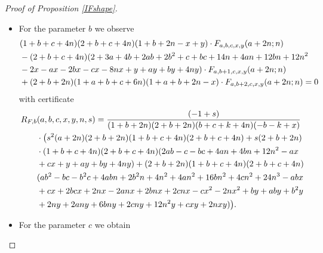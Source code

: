 \documentclass{amsart}
\numberwithin{equation}{section}
\begin{document}
\begin{proof}[Proof of Proposition \ref{IFshape}]
\begin{itemize}
\begin{align}
                 4 c n - 12 n^2 + a x + c x + 4 n x  \hphantom{a}\notag\\
            &+y + a y + b y + 4 n y)\cdot F_{a+1,b,c,x,y}(a+1+2n;n)\hphantom{a}\notag\\
            &+(1 + a + b + c + 6 n) (1 + a + b + 2 n - x)\cdot F_{a+2,b,c,x,y}(a+2+2n;n)=0\notag
        \end{align}
        with certificate
        \[R_{F,a}(a,b,c,x,y,n,s)=\frac{(-1 + s) (a + 2 n) (-1 + b + c + s + 4 n) (1 - b - s + x)}{(1 + a - k + 2 n) (2 + a - k + 2 n)}.\]
        \item For the parameter $b$ we observe
        \begin{align}
            &(1 + b + c + 4 n) (2 + b + c + 4 n) (1 + b + 2 n - x + y)\cdot F_{a,b,c,x,y}(a+2n;n)\hphantom{a}\\
            &-(2 + b + c + 4 n)  (2 + 3 a + 4 b + 2 a b + 2 b^2 + c + b c + 14 n + 
             4 a n + 12 b n + 12 n^2\hphantom{a}\notag\\
             &- 2 x - a x - 2 b x - c x - 8 n x + y + a y + b y + 4  n  y)\cdot F_{a,b+1,c,x,y}(a+2n;n)\hphantom{a}\notag\\
            &+(2 + b + 2 n) (1 + a + b + c + 6 n) (1 + a + b + 2 n - x)\cdot F_{a,b+2,c,x,y}(a+2n;n)=0\notag
        \end{align}
        with certificate
        \begin{align}
        R_{F,b}&(a,b,c,x,y,n,s)=\frac{(-1+s)}{(1 + b + 2 n) (2 + b + 2 n) (b + c + k + 4 n) (-b - k + x)}\notag\\
        &\cdot \big(s^2 (a + 2 n) (2 + b + 2 n) (1 + b + c + 4 n) (2 + b + c + 4 n) + 
 s (2 + b + 2 n)\notag\\
 &\cdot(1 + b + c + 4 n) (2 + b + c + 4 n) (2 a b - c - 
    b c + 4 a n + 4 b n + 12 n^2 - a x\notag\\
    &+ c x + y + a y + b y + 
    4 n y) + (2 + b + 2 n) (1 + b + c + 4 n) (2 + b + c + 
    4 n)\notag\\& (a b^2 - b c - b^2 c + 4 a b n + 2 b^2 n + 4 n^2 + 4 a n^2 + 
    16 b n^2 + 4 c n^2 + 24 n^3 - a b x \notag\\
    &+ c x + 2 b c x + 2 n x - 
    2 a n x + 2 b n x + 2 c n x - c x^2 - 2 n x^2 + b y + a b y + 
    b^2 y \notag\\
    &+ 2 n y + 2 a n y + 6 b n y + 2 c n y + 12 n^2 y + c x y + 
    2 n x y)\big).\notag
        \end{align}
        \item For the parameter $c$ we obtain

\end{itemize}
\end{proof}
\end{document}
